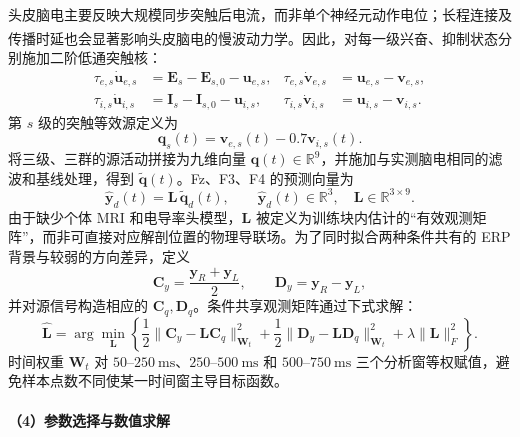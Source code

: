 \documentclass[a4paper]{ctexart}
\numberwithin{figure}{section}       %
\newcommand{\upcite}[1]{\textsuperscript{\cite{#1}}} %
\begin{document}
头皮脑电主要反映大规模同步突触后电流，而非单个神经元动作电位；长程连接及传播时延也会显著影响头皮脑电的慢波动力学\upcite{steeghs2025slow}。因此，对每一级兴奋、抑制状态分别施加二阶低通突触核：
\begin{align}
\tau_{e,s}\dot{\boldsymbol u}_{e,s}
&=\boldsymbol E_s-\boldsymbol E_{s,0}-\boldsymbol u_{e,s},
&
\tau_{e,s}\dot{\boldsymbol v}_{e,s}
&=\boldsymbol u_{e,s}-\boldsymbol v_{e,s}, \label{eq:q2_syn_e}\\
\tau_{i,s}\dot{\boldsymbol u}_{i,s}
&=\boldsymbol I_s-\boldsymbol I_{s,0}-\boldsymbol u_{i,s},
&
\tau_{i,s}\dot{\boldsymbol v}_{i,s}
&=\boldsymbol u_{i,s}-\boldsymbol v_{i,s}. \label{eq:q2_syn_i}
\end{align}
第 $s$ 级的突触等效源定义为
\begin{equation}
\boldsymbol q_s(t)=
\boldsymbol v_{e,s}(t)-0.7\boldsymbol v_{i,s}(t).
\label{eq:q2_source}
\end{equation}
将三级、三群的源活动拼接为九维向量 $\boldsymbol q(t)\in\mathbb R^9$，并施加与实测脑电相同的滤波和基线处理，得到 $\widetilde{\boldsymbol q}(t)$。Fz、F3、F4 的预测向量为
\begin{equation}
\widehat{\boldsymbol y}_d(t)
=\boldsymbol L\,\widetilde{\boldsymbol q}_d(t),
\qquad
\widehat{\boldsymbol y}_d(t)\in\mathbb R^3,\quad
\boldsymbol L\in\mathbb R^{3\times 9}.
\label{eq:q2_observation}
\end{equation}
由于缺少个体 MRI 和电导率头模型，$\boldsymbol L$ 被定义为训练块内估计的“有效观测矩阵”，而非可直接对应解剖位置的物理导联场。为了同时拟合两种条件共有的 ERP 背景与较弱的方向差异，定义
\[
\boldsymbol C_y=\frac{\boldsymbol y_R+\boldsymbol y_L}{2},
\qquad
\boldsymbol D_y=\boldsymbol y_R-\boldsymbol y_L,
\]
并对源信号构造相应的 $\boldsymbol C_q,\boldsymbol D_q$。条件共享观测矩阵通过下式求解：
\begin{equation}
\widehat{\boldsymbol L}
=\arg\min_{\boldsymbol L}
\left\{
\frac12\|\boldsymbol C_y-\boldsymbol L\boldsymbol C_q\|_{\boldsymbol W_t}^{2}
+\frac12\|\boldsymbol D_y-\boldsymbol L\boldsymbol D_q\|_{\boldsymbol W_t}^{2}
+\lambda\|\boldsymbol L\|_F^2
\right\}.
\label{eq:q2_readout}
\end{equation}
时间权重 $\boldsymbol W_t$ 对 $50$--$250~\mathrm{ms}$、$250$--$500~\mathrm{ms}$ 和 $500$--$750~\mathrm{ms}$ 三个分析窗等权赋值，避免样本点数不同使某一时间窗主导目标函数。

\paragraph{（4）参数选择与数值求解}
\end{document}
